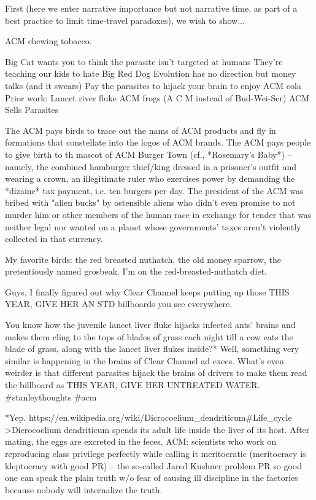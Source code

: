 First (here we enter narrative importance but not narrative time, as part of a best practice to limit time-travel paradoxes), we wish to show... 

ACM chewing tobacco.

Big Cat wants you to think the parasite isn't targeted at humans
They're teaching our kids to hate Big Red Dog
Evolution has no direction but money talks (and it swears)
Pay the parasites to hijack your brain to enjoy ACM cola
Prior work: Lancet river fluke
ACM frogs (A C M instead of Bud-Wei-Ser)
ACM Sells Parasites

The ACM pays birds to trace out the nams of ACM products and fly in formations that constellate into the logos of ACM brands. The ACM pays people to give birth to th mascot of ACM Burger Town (cf., *Rosemary's Baby*) -- namely, the combined hamburger thief/king dressed in a prisoner's outfit and wearing a crown, an illegitimate ruler who exercises power by demanding the *dizaine* tax payment, i.e. ten burgers per day. The president of the ACM was bribed with "alien bucks" by ostensible aliens who didn't even promise to not murder him or other members of the human race in exchange for tender that was neither legal nor wanted on a planet whose governments' taxes aren't violently collected in that currency.

My favorite birds: the red breasted nuthatch, the old money sparrow, the pretentiously named grosbeak. I'm on the red-breasted-nuthatch diet. 


Guys, I finally figured out why Clear Channel keeps putting up those THIS YEAR, GIVE HER AN STD billboards you see everywhere.

You know how the juvenile lancet liver fluke hijacks infected ants' brains and makes them cling to the tops of blades of grass each night till a cow eats the blade of grass, along with the lancet liver flukes inside?* Well, something very similar is happening in the brains of Clear Channel ad execs. What's even weirder is that different parasites hijack the brains of drivers to make them read the billboard as THIS YEAR, GIVE HER UNTREATED WATER. #stanleythoughts #acm

*Yep. https://en.wikipedia.org/wiki/Dicrocoelium_dendriticum#Life_cycle
>Dicrocoelium dendriticum spends its adult life inside the liver of its host. After mating, the eggs are excreted in the feces.
ACM: scientists who work on reproducing class privilege perfectly while calling it meritocratic (meritocracy is kleptocracy with good PR) -- the so-called Jared Kushner problem
PR so good one can speak the plain truth w/o fear of causing ill discipline in the factories because nobody will internalize the truth. 

